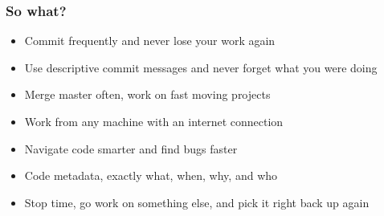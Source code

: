 \documentclass{beamer}
\begin{document}
\begin{frame}[fragile]

\frametitle{So what?}

\begin{itemize}
  \item{Commit frequently and never lose your work again}
  \item{Use descriptive commit messages and never forget what you were doing}
  \item{Merge master often, work on fast moving projects}
  \item{Work from any machine with an internet connection}
  \item{Navigate code smarter and find bugs faster}
  \item{Code metadata, exactly what, when, why, and who}
  \item{Stop time, go work on something else, and pick it right back up again}
\end{itemize}
    
\end{frame}
\end{document}
